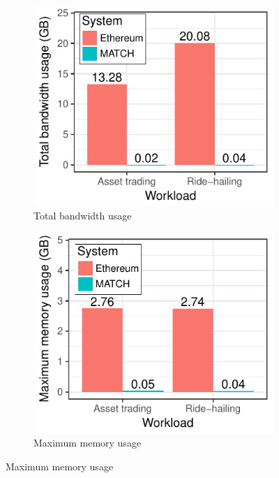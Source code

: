 \begin{figure}[t!]
	\centering
	\begin{subfigure}{.5\columnwidth}
		\centering
		\includegraphics[width=\linewidth]{match/assets/plots/ethereum_bandwidth.pdf}
		\caption{Total bandwidth usage}
		\label{fig:ethereum_bandwidth}
	\end{subfigure}%
	\begin{subfigure}{.5\columnwidth}
		\centering
		\includegraphics[width=\linewidth]{match/assets/plots/ethereum_memory.pdf}
		\caption{Maximum memory usage}

\end{subfigure}
\end{figure}

